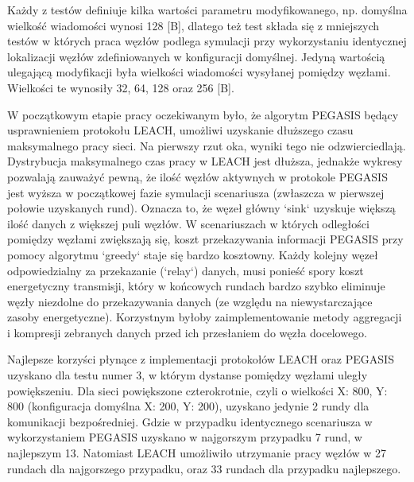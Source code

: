 \documentclass[a4paper,12pt,twoside,openany]{report}
\begin{document}
\par
Każdy z testów definiuje kilka wartości parametru modyfikowanego, np. domyślna wielkość wiadomości wynosi 128 [B], dlatego też test składa się z mniejszych testów w których
praca węzłów podlega symulacji przy wykorzystaniu identycznej lokalizacji węzłów zdefiniowanych w konfiguracji domyślnej. Jedyną wartością ulegającą modyfikacji była
wielkości wiadomości wysyłanej pomiędzy węzłami. Wielkości te wynosiły 32, 64, 128 oraz 256 [B].
\par
W początkowym etapie pracy oczekiwanym było, że algorytm PEGASIS będący usprawnieniem protokołu LEACH, umożliwi uzyskanie dłuższego czasu maksymalnego pracy sieci.
Na pierwszy rzut oka, wyniki tego nie odzwierciedlają. Dystrybucja maksymalnego czas pracy w LEACH jest dłuższa, jednakże wykresy pozwalają zauważyć pewną, że ilość węzłów aktywnych
w protokole PEGASIS jest wyższa w początkowej fazie symulacji scenariusza (zwłaszcza w pierwszej połowie uzyskanych rund). Oznacza to, że węzeł główny `sink` uzyskuje większą ilość
danych z większej puli węzłów.
W scenariuszach w których odległości pomiędzy węzłami zwiększają się, koszt przekazywania informacji PEGASIS przy pomocy algorytmu `greedy` staje się bardzo kosztowny. Każdy kolejny węzeł
odpowiedzialny za przekazanie (`relay`) danych, musi ponieść spory koszt energetyczny transmisji, który w końcowych rundach bardzo szybko eliminuje węzły niezdolne do przekazywania danych
(ze względu na niewystarczające zasoby energetyczne). Korzystnym byłoby zaimplementowanie metody aggregacji i kompresji zebranych danych przed ich przesłaniem do węzła docelowego.
\par
Najlepsze korzyści płynące z implementacji protokołów LEACH oraz PEGASIS uzyskano dla testu numer 3, w którym dystanse pomiędzy węzłami uległy powiększeniu.
Dla sieci powiększone czterokrotnie, czyli o wielkości X: 800, Y: 800 (konfiguracja domyślna X: 200, Y: 200), uzyskano jedynie 2 rundy dla komunikacji bezpośredniej.
Gdzie w przypadku identycznego scenariusza w wykorzystaniem PEGASIS uzyskano w najgorszym przypadku 7 rund, w najlepszym 13. Natomiast LEACH umożliwiło utrzymanie pracy węzłów 
w 27 rundach dla najgorszego przypadku, oraz 33 rundach dla przypadku najlepszego.
\end{document}
